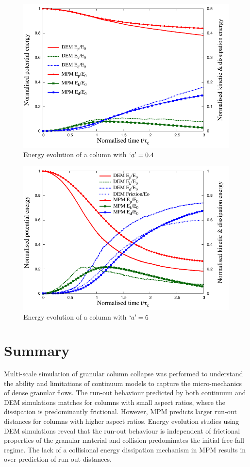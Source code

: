 \begin{figure}[tbhp]
\centering
\includegraphics[width=\textwidth]{a04_energy}
\caption{Energy evolution of a column with $`a'=0.4$}
\label{fig:a04_energy}
\end{figure}

\begin{figure}[tbhp]
\centering
\includegraphics[width=\textwidth]{a6_energy}
\caption{Energy evolution of a column with $`a'=6$}
\label{fig:a6_energy}
\end{figure}

\section{Summary}
Multi-scale simulation of granular column collapse was performed to understand 
the ability and limitations of continuum models to capture the micro-mechanics 
of dense granular flows. The run-out behaviour predicted by both continuum and 
DEM simulations matches for columns with small aspect ratios, where the 
dissipation is predominantly frictional. However, MPM predicts larger run-out 
distances for columns with higher aspect ratios. Energy evolution studies using 
DEM simulations reveal that the run-out behaviour is independent of frictional 
properties of the granular material and collision predominates the initial 
free-fall regime. The lack of a collisional energy dissipation mechanism in MPM 
results in over prediction of run-out distances. 